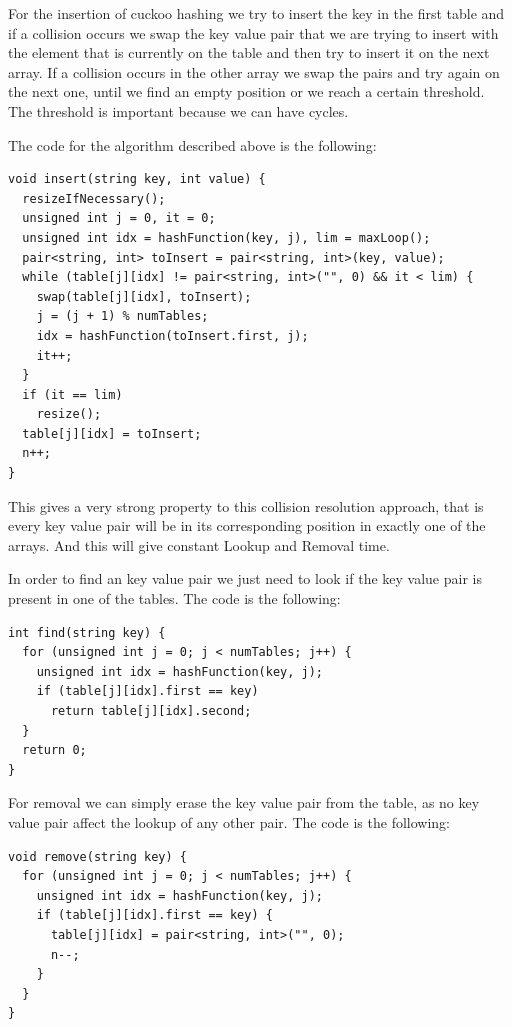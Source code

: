 
For the insertion of cuckoo hashing we try to insert the key in the first table and if a collision occurs we swap the key value pair that we are trying to insert with the element that is currently on the table and then try to insert it on the next array. If a collision occurs in the other array we swap the pairs and try again on the next one, until we find an empty position or we reach a certain threshold. The threshold is important because we can have cycles.


The code for the algorithm described above is the following:

\begin{lstlisting}
void insert(string key, int value) {
  resizeIfNecessary();
  unsigned int j = 0, it = 0;
  unsigned int idx = hashFunction(key, j), lim = maxLoop();
  pair<string, int> toInsert = pair<string, int>(key, value);
  while (table[j][idx] != pair<string, int>("", 0) && it < lim) {
    swap(table[j][idx], toInsert);
    j = (j + 1) % numTables;
    idx = hashFunction(toInsert.first, j);
    it++;
  }
  if (it == lim)
    resize();
  table[j][idx] = toInsert;
  n++;
}
\end{lstlisting}

This gives a very strong property to this collision resolution approach, that is every key value pair will be in its corresponding position in exactly one of the arrays. And this will give constant Lookup and Removal time. 

In order to find an key value pair we just need to look if the key value pair is present in one of the tables. The code is the following:

\begin{lstlisting}
int find(string key) {
  for (unsigned int j = 0; j < numTables; j++) {
    unsigned int idx = hashFunction(key, j);
    if (table[j][idx].first == key)
      return table[j][idx].second;
  }
  return 0;
}
\end{lstlisting}

For removal we can simply erase the key value pair from the table, as no key value pair affect the lookup of any other pair. The code is the following:

\begin{lstlisting}
void remove(string key) {
  for (unsigned int j = 0; j < numTables; j++) {
    unsigned int idx = hashFunction(key, j);
    if (table[j][idx].first == key) {
      table[j][idx] = pair<string, int>("", 0);
      n--;
    }
  }
}
\end{lstlisting}

